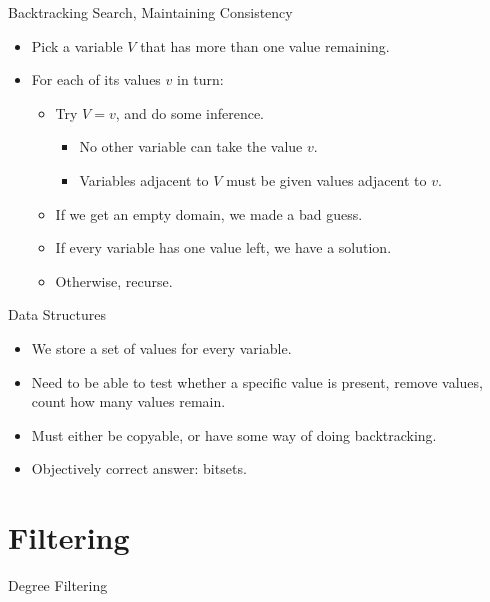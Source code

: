 \documentclass[aspectratio=169,compress,10pt]{beamer}
\begin{document}
\begin{frame}{Backtracking Search, Maintaining Consistency}
    \begin{itemize}
        \item Pick a variable $V$ that has more than one value remaining.
        \item For each of its values $v$ in turn:
            \begin{itemize}
                \item Try $V = v$, and do some inference.
                    \begin{itemize}
                        \item No other variable can take the value $v$.
                        \item Variables adjacent to $V$ must be given values adjacent to $v$.
                    \end{itemize}
                \item If we get an empty domain, we made a bad guess.
                \item If every variable has one value left, we have a solution.
                \item Otherwise, recurse.
            \end{itemize}
    \end{itemize}
\end{frame}

\begin{frame}{Data Structures}
    \begin{itemize}
        \item We store a set of values for every variable.
        \item Need to be able to test whether a specific value is present, remove values,
            count how many values remain.
        \item Must either be copyable, or have some way of doing backtracking.
        \item <2-> Objectively correct answer: bitsets.
    \end{itemize}
\end{frame}

\section{Filtering}

\begin{frame}{Degree Filtering}
\end{frame}
\end{document}
